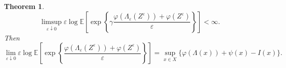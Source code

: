 \documentclass{amsart}[11pt]
\numberwithin{equation}{section}
\newtheorem{theorem}{Theorem}%
\numberwithin{theorem}{subsection}
\numberwithin{proposition}{subsection}
\numberwithin{definition}{subsection}
\numberwithin{lemma}{subsection}
\numberwithin{assumption}{subsection}
\newcommand{\HH}{\mathbb{H}}
\newcommand{\RR}{\mathbb{R}}
\newcommand{\R}{\RR}
\newcommand{\EE}{\mathbb{E}}
\newcommand{\D}{\mathrm{d}}
\newcommand{\IIV}{\mathrm{I}^{V}}
\newcommand{\eps}{\varepsilon}
\begin{document}
{\begin{theorem}
$$
\limsup\limits_{\eps \downarrow 0}
\eps\log \EE\left[\exp\left\{\gamma \frac{\varphi(\Lambda_{\eps}(Z^{\eps})) + \varphi(Z^{\eps})}{\eps}\right\}\right]< \infty.
$$
Then
$$
\lim_{\eps \downarrow 0}
\eps\log \EE\left[\exp\left\{\frac{\varphi(\Lambda_{\eps}(Z^{\eps})) + \varphi(Z^{\eps})}{\eps}\right\}\right]
= \sup\limits_{x \in X} \{\varphi(\Lambda(x)) + \psi(x) - I(x) \}.
$$
\end{theorem}
}

  
%
\end{document}
